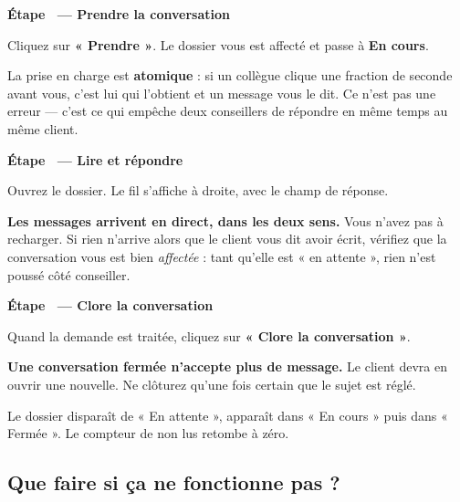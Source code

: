 \documentclass[11pt,a4paper]{report}
\newcounter{etape}[section]
\newcommand{\etape}[1]{%
  \stepcounter{etape}%
  \vspace{9pt}%
  \noindent{\color{garahPrimaire}\rule{3pt}{13pt}}\hspace{6pt}%
  {\bfseries\large Étape \theetape\ --- #1}\par\vspace{4pt}%
}
\begin{document}
\etape{Prendre la conversation}

Cliquez sur \textbf{« Prendre »}. Le dossier vous est affecté et passe à
\textbf{En cours}.

\begin{attention}
La prise en charge est \textbf{atomique} : si un collègue clique une fraction de
seconde avant vous, c'est lui qui l'obtient et un message vous le dit. Ce n'est
pas une erreur — c'est ce qui empêche deux conseillers de répondre en même temps
au même client.
\end{attention}

\etape{Lire et répondre}

Ouvrez le dossier. Le fil s'affiche à droite, avec le champ de réponse.

\begin{attention}
\textbf{Les messages arrivent en direct, dans les deux sens.} Vous n'avez pas à
recharger. Si rien n'arrive alors que le client vous dit avoir écrit,
vérifiez que la conversation vous est bien \emph{affectée} : tant qu'elle est
« en attente », rien n'est poussé côté conseiller.
\end{attention}

\etape{Clore la conversation}

Quand la demande est traitée, cliquez sur \textbf{« Clore la conversation »}.

\begin{attention}
\textbf{Une conversation fermée n'accepte plus de message.} Le client devra en
ouvrir une nouvelle. Ne clôturez qu'une fois certain que le sujet est réglé.
\end{attention}

\begin{resultat}
Le dossier disparaît de « En attente », apparaît dans « En cours » puis dans
« Fermée ». Le compteur de non lus retombe à zéro.
\end{resultat}

\subsection{Que faire si ça ne fonctionne pas ?}
\end{document}
